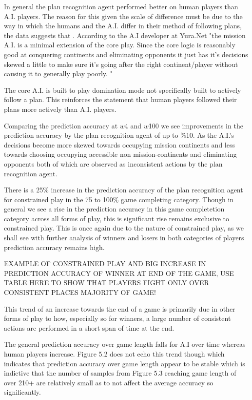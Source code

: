 \documentclass[parskip]{cs4rep}
\begin{document}
In general the plan recognition agent performed better on human players than A.I. players. The reason for this given the scale of difference must be due to the way in which the humans and the A.I. differ in their method of following plans, the data suggests that . According to the A.I developer at Yura.Net "the mission A.I. is a minimal extension of the core play. Since the core logic is reasonably good at conquering continents and eliminating opponents it just has it's decisions skewed a little to make sure it's going after the right continent/player without causing it to generally play poorly. "

The core A.I. is built to play domination mode not specifically built to actively follow a plan. This reinforces the statement that human players followed their plans more actively than A.I. players.

Comparing the prediction accuracy at $w$4 and $w$100 we see improvements in the prediction accuracy by the plan recognition agent of up to \%10. As the A.I.'s decisions become more skewed towards occupying mission continents and less towards choosing occupying accessible non mission-continents and eliminating opponents both of which are observed as inconsistent actions by the plan recognition agent.

There is a 25\% increase in the prediction accuracy of the plan recognition agent for constrained play in the 75 to 100\% game completing category. Though in general we see a rise in the prediction accuracy in this game completetion category across all forms of play, this is significant rise remains exclusive to constrained play. This is once again due to the nature of constrained play, as we shall see with further analysis of winners and losers in both categories of players prediction accuracy remains high.

EXAMPLE OF CONSTRAINED PLAY AND BIG INCREASE IN PREDICTION ACCURACY OF WINNER AT END OF THE GAME, USE TABLE HERE TO SHOW THAT PLAYERS FIGHT ONLY OVER CONSISTENT PLACES MAJORITY OF GAME!

This trend of an increase towards the end of a game is primarily due in other forms of play to how, especially so for winners, a large number of consistent actions are performed in a short span of time at the end.

The general prediction accuracy over game length falls for A.I over time whereas human players increase. Figure 5.2 does not echo this trend though which indicates that prediction accuracy over game length appear to be stable which is indictive that the number of samples from Figure 5.3 reaching game length of over 210+ are relatively small as to not affect the average accuracy so significantly. 
\end{document}

